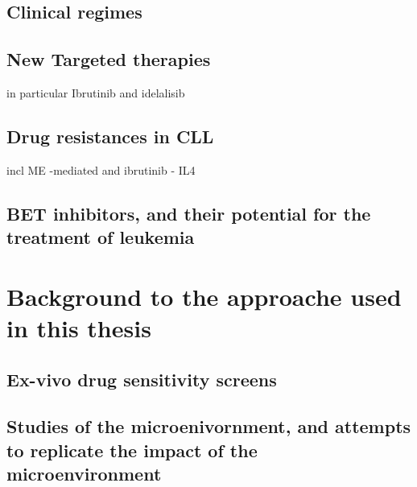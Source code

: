 \documentclass[11pt, a4paper, twosided]{book}
\begin{document}
\hypertarget{clinical-regimes}{%
\section{Clinical regimes}\label{clinical-regimes}}

\hypertarget{new-targeted-therapies}{%
\section{New Targeted therapies}\label{new-targeted-therapies}}

in particular Ibrutinib and idelalisib

\hypertarget{drug-resistances-in-cll}{%
\section{Drug resistances in CLL}\label{drug-resistances-in-cll}}

incl ME -mediated and ibrutinib - IL4

\hypertarget{bet-inhibitors-and-their-potential-for-the-treatment-of-leukemia}{%
\section{BET inhibitors, and their potential for the treatment of leukemia}\label{bet-inhibitors-and-their-potential-for-the-treatment-of-leukemia}}

\hypertarget{background-to-the-approache-used-in-this-thesis}{%
\chapter{Background to the approache used in this thesis}\label{background-to-the-approache-used-in-this-thesis}}

\hypertarget{ex-vivo-drug-sensitivity-screens}{%
\section{Ex-vivo drug sensitivity screens}\label{ex-vivo-drug-sensitivity-screens}}

\hypertarget{studies-of-the-microenivornment-and-attempts-to-replicate-the-impact-of-the-microenvironment}{%
\section{Studies of the microenivornment, and attempts to replicate the impact of the microenvironment}\label{studies-of-the-microenivornment-and-attempts-to-replicate-the-impact-of-the-microenvironment}}
\end{document}
